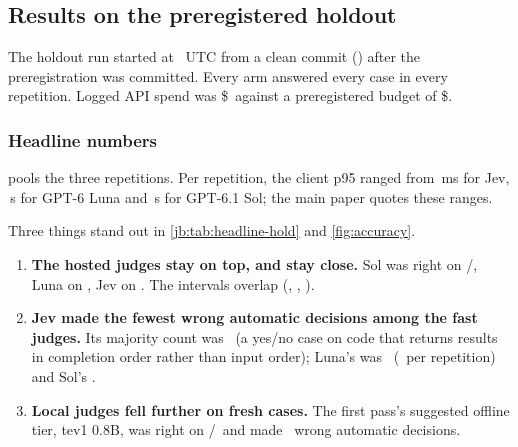 \subsection{Results on the preregistered holdout \texorpdfstring{\prereg}{[preregistered]}}\label{jb:sec:holdout}

The holdout run started at \HoldStarted\ UTC from a clean commit (\code{\HoldCommit}) after the
preregistration was committed. Every arm answered every case in every repetition. Logged API spend was
\$\HoldSpendUSD\ against a preregistered budget of \$\HoldBudgetUSD.

\subsubsection{Headline numbers}

\begin{table}[tbp]
\centering\small
\caption{Holdout \prereg, \HoldN\ cases, \HoldReps\ repetitions, policy .
Same conventions as \cref{jb:tab:headline-dev}.}
\label{jb:tab:headline-hold}

\end{table}

 pools the three repetitions. Per repetition, the client p95 ranged from \JevHoldPninetyfiveRange\,ms for Jev, \LunaHoldPninetyfiveRangeS\,s for GPT-6 Luna and \SolHoldPninetyfiveRangeS\,s for GPT-6.1 Sol; the main paper quotes these ranges.



Three things stand out in \cref{jb:tab:headline-hold} and \cref{fig:accuracy}.
\begin{enumerate}
  \item \textbf{The hosted judges stay on top, and stay close.} Sol was right on \SolHoldAccK/\HoldN,
    Luna on \LunaHoldAccK, Jev on \JevHoldAccK. The intervals overlap
    (\SolHoldAccCI, \LunaHoldAccCI, \JevHoldAccCI).
  \item \textbf{Jev made the fewest wrong automatic decisions among the fast judges.} Its majority
    count was \JevHoldWaK\ (a yes/no case on code that returns results in completion order rather than
    input order); Luna's was \LunaHoldWaK\ (\LunaHoldWaRange\ per repetition) and Sol's \SolHoldWaK.
  \item \textbf{Local judges fell further on fresh cases.} The first pass's suggested offline tier,
    tev1 0.8B, was right on \TevPtEightHoldAccK/\HoldN\ and made \TevPtEightHoldWaK\ wrong automatic
    decisions.
\end{enumerate}

